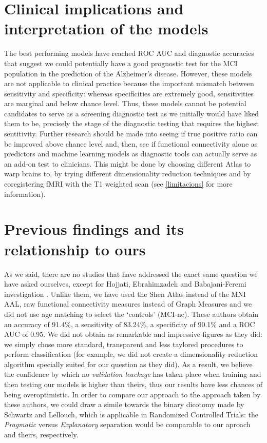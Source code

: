 \documentclass[a4paper,12pt]{elsarticle}  %
\begin{document}
	
	\section{Clinical implications and interpretation of the models} %
	
	The best performing models have reached ROC AUC and diagnostic accuracies that suggest we could potentially have a good prognostic test for the MCI population in the prediction of the Alzheimer's disease. However, these models are not applicable to clinical practice because the important mismatch between sensitivity and specificity: whereas specificities are extremely good, sensitivities are marginal and below chance level. Thus, these models cannot be potential candidates to serve as a screening diagnostic test as we initially would have liked them to be, precisely the stage of the diagnostic testing that requires the highest sentitivity. Further research should be made into seeing if true positive ratio can be improved above chance level and, then, see if functional connectivity alone as predictors and machine learning models as diagnostic tools can actually serve as an add-on test to clinicians. This might be done by choosing different Atlas to warp brains to, by trying different dimensionality reduction techniques and by coregistering fMRI with the T1 weighted scan (see \ref{limitacions} for more information).
	

	
	
	\section{Previous findings and its relationship to ours} \label{biomarcadors i clinica discussio}
	As we said, there are no studies that have addressed the exact same question we have asked ourselves, except for Hojjati, Ebrahimzadeh and Babajani-Feremi investigation \cite{Hojjati201769}. Unlike them, we have used the Shen Atlas instead of the MNI AAL, raw functional connectivity measures instead of Graph Measures and we did not use age matching to select the `controls' (MCI-nc). These authors obtain an accuracy of 91.4\%, a sensitivity of 83.24\%, a specificity of 90.1\% and a ROC AUC of 0.95. We did not obtain as remarkable and impressive figures as they did: we simply chose more standard, transparent and less taylored procedures to perform classification (for example, we did not create a dimensionality reduction algorithm specially suited for our question as they did). As a result, we believe the confidence by which no \textit{validation leackage}\cite{Luo2016} has taken place when training and then testing our models is higher than theirs, thus our results have less chances of being overoptimistic. In order to compare our approach to the approach taken by these authors, we could draw a simile towards the binary dicotomy made by Schwartz and Lellouch\cite{Zwarenstein20081223}, which is applicable in Randomized Controlled Trials: the \textit{Pragmatic} versus \textit{Explanatory} separation would be comparable to our aproach and theirs, respectively.
		
\end{document}
